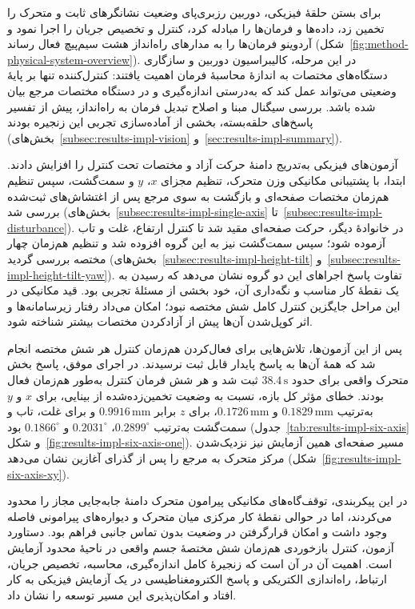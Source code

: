 برای بستن حلقهٔ فیزیکی، دوربین رزبری‌پای وضعیت نشانگرهای  ثابت و متحرک را تخمین زد،  داده‌ها و فرمان‌ها را مبادله کرد،  کنترل و تخصیص جریان را اجرا نمود و آردوینو فرمان‌ها را به مدارهای راه‌انداز هشت سیم‌پیچ فعال رساند (شکل~\ref{fig:method-physical-system-overview}). در این مرحله، کالیبراسیون دوربین و سازگاری دستگاه‌های مختصات به اندازهٔ محاسبهٔ فرمان اهمیت یافتند: کنترل‌کننده تنها بر پایهٔ وضعیتی می‌تواند عمل کند که به‌درستی اندازه‌گیری و در دستگاه مختصات مرجع بیان شده باشد. بررسی سیگنال مبنا و اصلاح تبدیل فرمان به راه‌انداز، پیش از تفسیر پاسخ‌های حلقه‌بسته، بخشی از آماده‌سازی تجربی این زنجیره بودند (بخش‌های~\ref{subsec:results-impl-vision} و~\ref{sec:results-impl-summary}).

آزمون‌های فیزیکی به‌تدریج دامنهٔ حرکت آزاد و مختصات تحت کنترل را افزایش دادند. ابتدا، با پشتیبانی مکانیکی وزن متحرک، تنظیم مجزای \(x\)، \(y\) و سمت‌گشت، سپس تنظیم هم‌زمان مختصات صفحه‌ای و بازگشت به سوی مرجع پس از اغتشاش‌های ثبت‌شده بررسی شد (بخش‌های~\ref{subsec:results-impl-single-axis} تا~\ref{subsec:results-impl-disturbance}). در خانوادهٔ دیگر، حرکت صفحه‌ای مقید شد تا کنترل ارتفاع، غلت و تاب آزموده شود؛ سپس سمت‌گشت نیز به این گروه افزوده شد و تنظیم هم‌زمان چهار مختصه بررسی گردید (بخش‌های~\ref{subsec:results-impl-height-tilt} و~\ref{subsec:results-impl-height-tilt-yaw}). تفاوت پاسخ اجراهای این دو گروه نشان می‌دهد که رسیدن به یک نقطهٔ کار مناسب و نگه‌داری آن، خود بخشی از مسئلهٔ تجربی بود. قید مکانیکی در این مراحل جایگزین کنترل کامل شش مختصه نبود؛ امکان می‌داد رفتار زیرسامانه‌ها و اثر کوپل‌شدن آن‌ها پیش از آزادکردن مختصات بیشتر شناخته شود.

پس از این آزمون‌ها، تلاش‌هایی برای فعال‌کردن هم‌زمان کنترل هر شش مختصه انجام شد که همهٔ آن‌ها به پاسخ پایدار قابل ثبت نرسیدند. در اجرای موفق، پاسخ بخش متحرک واقعی برای حدود \(38.4\,\mathrm{s}\) ثبت شد و هر شش فرمان کنترل به‌طور هم‌زمان فعال بودند. خطای مؤثر  کل بازه، نسبت به وضعیت تخمین‌زده‌شده از بینایی، برای \(x\) و \(y\) به‌ترتیب \(0.1829\,\mathrm{mm}\) و \(0.1726\,\mathrm{mm}\)، برای \(z\) برابر \(0.9916\,\mathrm{mm}\) و برای غلت، تاب و سمت‌گشت به‌ترتیب \(0.2899^\circ\)، \(0.2031^\circ\) و \(0.1866^\circ\) بود (جدول~\ref{tab:results-impl-six-axis} و شکل~\ref{fig:results-impl-six-axis-one}). مسیر صفحه‌ای همین آزمایش نیز نزدیک‌شدن مرکز متحرک به مرجع را پس از گذرای آغازین نشان می‌دهد (شکل~\ref{fig:results-impl-six-axis-xy}).

در این پیکربندی، توقف‌گاه‌های مکانیکی پیرامون متحرک دامنهٔ جابه‌جایی مجاز را محدود می‌کردند، اما در حوالی نقطهٔ کار مرکزی میان متحرک و دیواره‌های پیرامونی فاصله وجود داشت و امکان قرارگرفتن در وضعیت بدون تماس جانبی فراهم بود. دستاورد آزمون، کنترل بازخوردی هم‌زمان شش مختصهٔ جسم واقعی در ناحیهٔ محدود آزمایش است. اهمیت آن در آن است که زنجیرهٔ کامل اندازه‌گیری، محاسبه، تخصیص جریان، ارتباط، راه‌اندازی الکتریکی و پاسخ الکترومغناطیسی در یک آزمایش فیزیکی به کار افتاد و امکان‌پذیری این مسیر توسعه را نشان داد.

